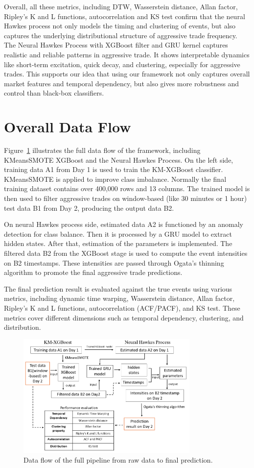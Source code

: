 Overall, all these metrics, including DTW, Wasserstein distance, Allan factor, Ripley's K and L functions, autocorrelation and KS test confirm that the neural Hawkes process not only models the timing and clustering of events, but also captures the underlying distributional structure of aggressive trade frequency. The Neural Hawkes Process with XGBoost filter and GRU kernel captures realistic and reliable patterns in aggressive trade. It shows interpretable dynamics like short-term excitation, quick decay, and clustering, especially for aggressive trades. This supports our idea that using our framework not only captures overall market features and temporal dependency, but also gives more robustness and control than black-box classifiers.

\section{Overall Data Flow}
Figure~\ref{fig:data-flow-diagram} illustrates the full data flow of the framework, including KMeansSMOTE XGBoost and the Neural Hawkes Process. On the left side, training data A1 from Day 1 is used to train the KM-XGBoost classifier. KMeansSMOTE is applied to improve class imbalance. Normally the final training dataset contains  over 400,000 rows and 13 columns. The trained model is then used to filter aggressive trades on window-based (like 30 minutes or 1 hour) test data B1 from Day 2, producing the output data B2.

On neural Hawkes process side, estimated data A2 is functioned by an anomaly detection for class balance. Then it is processed by a GRU model to extract hidden states. After that, estimation of the parameters is implemented. The filtered data B2 from the XGBoost stage is used to compute the event intensities on B2 timestamps. These intensities are passed through Ogata's thinning algorithm to promote the final aggressive trade predictions.

The final prediction result is evaluated against the true events using various metrics, including dynamic time warping, Wasserstein distance, Allan factor, Ripley's K and L functions, autocorrelation (ACF/PACF), and KS test. These metrics cover different dimensions such as temporal dependency, clustering, and distribution.
\begin{figure}[H]
    \centering
    \includegraphics[width=0.8\textwidth]{figures/data_flow1.png}
    \caption{Data flow of the full pipeline from raw data to final prediction.}
    \label{fig:data-flow-diagram}
\end{figure}